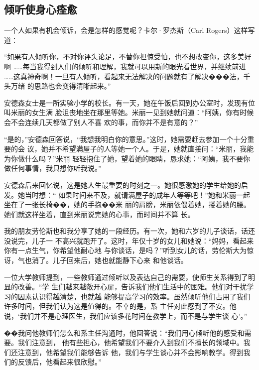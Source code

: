 \documentclass{ctexart}
\renewenvironment{quotation}{\setlength{\parskip}{0.5em}\setstretch{1.5}\kaishu\zihao{-5}\setlength{\parindent}{1em}}{\vspace{1em}}
\begin{document}
\subsection{倾听使身心痊愈}

一个人如果有机会倾诉，会是怎样的感觉呢？卡尔·罗杰斯（Carl Rogers）这样写道：

\begin{quotation}
	``如果有人倾听你，不对你评头论足，不替你担惊受怕，也不想改变你，这多美好啊
	\ldots\ldots 每当我得到人们的倾听和理解，我就可以用新的眼光看世界，并继续前进
	\ldots\ldots 这真神奇啊！一旦有人倾听，看起来无法解决的问题就有了解决���法，千头万绪
	的思路也会变得清晰起来。''
\end{quotation}

安德森女士是一所实验小学的校长。有一天，她在午饭后回到办公室时，发现有位叫米丽的女生满
脸沮丧地坐在那里等她。米丽一见到她就问道：``阿姨，你有时候会不会连续几天都做了别人不喜
欢的事，而你并不是有意的？''

``是的，''安德森回答说，``我想我明白你的意思。''这时，她需要赶去参加一个十分重要的会
议，她并不希望满屋子的人等她一个人。于是，她就直接问：``米丽，我能为你做什么吗？''米丽
轻轻抱住了她，望着她的眼睛，恳求她：``阿姨，我不要你做任何事情，我只想你听我说。''

安德森后来回忆说，这是她人生最重要的时刻之一。她很感激她的学生给她的启发。她当时想：``
如果时间来不及，就请满屋子的成年人等等吧！''她和米丽一起坐在了一张长椅��，她的手抱��米
丽的肩膀，米丽依偎着她，搂着她的腰。她们就这样坐着，直到米丽说完她的心事，而时间并不算
长。

我的朋友劳伦斯也和我分享了她的一段经历。有一次，她和六岁的儿子谈话，话还没说完，儿子一
不高兴就跑开了。这时，年仅十岁的女儿和她说：``妈妈，看起来你有一点生气，你希望他耐心地
与你谈话，是吗？''听到女儿的话，劳伦斯大为惊讶，气也消了。儿子回来后，她也就能静下心来
和他谈话。

一位大学教师提到，一些教师通过倾听以及表达自己的需要，使师生关系得到了明显的改善。``学
生们越来越敞开心扉，告诉我们他们生活中的困难。他们对干扰学习的因素认识得越清楚，也就越
能够提高学习的效率。虽然倾听他们占用了我们许多时间，但我们认为这是值得的。不幸的是，系
主任对此感到了不安。他说，`我们并不是心理医生，我们应该多花时间在教学上，而不是与学生谈
心'。''

��我问他教师们怎么和系主任沟通时，他回答说：``我们用心倾听他的感受和需要。我们注意到，
他有些担心，他希望我们不要介入到我们不擅长的领域中。我们还注意到，他希望我们能够告诉
他，我们与学生谈心并不会影响教学。得到我们的反馈后，他看起来很欣慰。''
\end{document}
